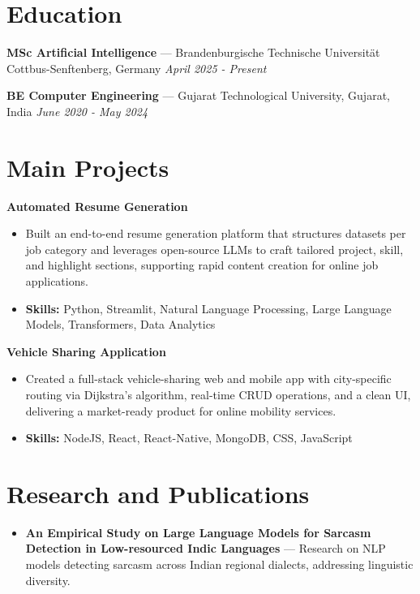 \documentclass[a4paper,10pt]{article}
\begin{document}
\section*{Education}
\textbf{MSc Artificial Intelligence} — Brandenburgische Technische Universität Cottbus-Senftenberg, Germany \hfill \textit{April 2025 - Present}\par
\vspace{1.5pt}
\textbf{BE Computer Engineering} — Gujarat Technological University, Gujarat, India \hfill \textit{June 2020 - May 2024}\par

\section*{Main Projects}
\textbf{Automated Resume Generation}\par
\vspace{1pt}
\begin{itemize}
  \item Built an end-to-end resume generation platform that structures datasets per job category and leverages open-source LLMs to craft tailored project, skill, and highlight sections, supporting rapid content creation for online job applications.
  \item \textbf{Skills:} Python, Streamlit, Natural Language Processing, Large Language Models, Transformers, Data Analytics
\end{itemize}
\vspace{3pt}
\textbf{Vehicle Sharing Application}\par
\vspace{1pt}
\begin{itemize}
  \item Created a full-stack vehicle-sharing web and mobile app with city-specific routing via Dijkstra's algorithm, real-time CRUD operations, and a clean UI, delivering a market-ready product for online mobility services.
  \item \textbf{Skills:} NodeJS, React, React-Native, MongoDB, CSS, JavaScript
\end{itemize}

\section*{Research and Publications}
\begin{itemize}
\item \textbf{An Empirical Study on Large Language Models for Sarcasm Detection in Low-resourced Indic Languages} — Research on NLP models detecting sarcasm across Indian regional dialects, addressing linguistic diversity.
\end{itemize}
\end{document}
